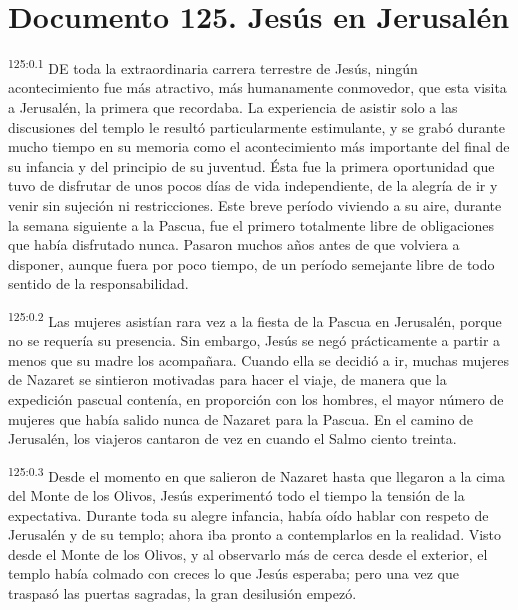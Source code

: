 \chapter{Documento 125. Jesús en Jerusalén}
\par
\textsuperscript{125:0.1} DE toda la extraordinaria carrera terrestre de Jesús, ningún acontecimiento fue más atractivo, más humanamente conmovedor, que esta visita a Jerusalén, la primera que recordaba. La experiencia de asistir solo a las discusiones del templo le resultó particularmente estimulante, y se grabó durante mucho tiempo en su memoria como el acontecimiento más importante del final de su infancia y del principio de su juventud. Ésta fue la primera oportunidad que tuvo de disfrutar de unos pocos días de vida independiente, de la alegría de ir y venir sin sujeción ni restricciones. Este breve período viviendo a su aire, durante la semana siguiente a la Pascua, fue el primero totalmente libre de obligaciones que había disfrutado nunca. Pasaron muchos años antes de que volviera a disponer, aunque fuera por poco tiempo, de un período semejante libre de todo sentido de la responsabilidad.

\par
\textsuperscript{125:0.2} Las mujeres asistían rara vez a la fiesta de la Pascua en Jerusalén, porque no se requería su presencia. Sin embargo, Jesús se negó prácticamente a partir a menos que su madre los acompañara. Cuando ella se decidió a ir, muchas mujeres de Nazaret se sintieron motivadas para hacer el viaje, de manera que la expedición pascual contenía, en proporción con los hombres, el mayor número de mujeres que había salido nunca de Nazaret para la Pascua. En el camino de Jerusalén, los viajeros cantaron de vez en cuando el Salmo ciento treinta.

\par
\textsuperscript{125:0.3} Desde el momento en que salieron de Nazaret hasta que llegaron a la cima del Monte de los Olivos, Jesús experimentó todo el tiempo la tensión de la expectativa. Durante toda su alegre infancia, había oído hablar con respeto de Jerusalén y de su templo; ahora iba pronto a contemplarlos en la realidad. Visto desde el Monte de los Olivos, y al observarlo más de cerca desde el exterior, el templo había colmado con creces lo que Jesús esperaba; pero una vez que traspasó las puertas sagradas, la gran desilusión empezó.

